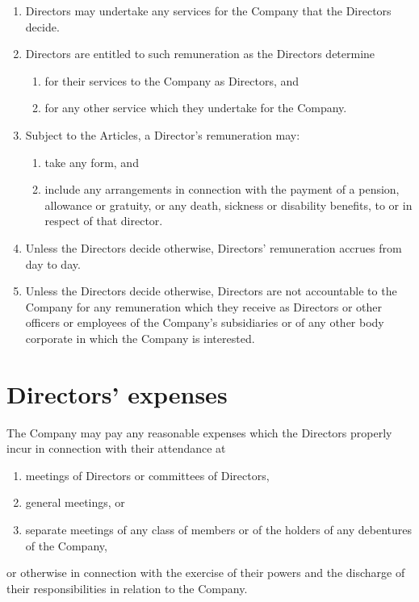 \documentclass[a4paper,12pt]{article}
\renewcommand{\labelenumi}{\thesection.\arabic{enumi}}
\renewcommand{\labelenumii}{\thesection.\arabic{enumi}.\arabic{enumii}}
\begin{document}
\begin{enumerate}
  \item Directors may undertake any services for the Company that the Directors decide.
  \item Directors are entitled to such remuneration as the Directors determine
  \begin{enumerate}
    \renewcommand{\labelenumii}{(\alph{enumii})}
    \item for their services to the Company as Directors, and
    \item for any other service which they undertake for the Company.
  \end{enumerate}
  \item	Subject to the Articles, a Director’s remuneration may:
  \begin{enumerate}
    \item take any form, and
    \item include any arrangements in connection with the payment of a pension, allowance or gratuity, or any death, sickness or disability benefits, to or in respect of that director.
  \end{enumerate}
  \item Unless the Directors decide otherwise, Directors’ remuneration accrues from day to day.
  \item	Unless the Directors decide otherwise, Directors are not accountable to the Company for any remuneration which they receive as Directors or other officers or employees of the Company’s subsidiaries or of any other body corporate in which the Company is interested.
\end{enumerate}

\section{Directors’ expenses}

The Company may pay any reasonable expenses which the Directors properly incur in connection with their attendance at

\begin{enumerate}
  \renewcommand{\labelenumi}{(\alph{enumi})}
  \item meetings of Directors or committees of Directors,
  \item general meetings, or
  \item separate meetings of any class of members or of the holders of any debentures of the Company,
\end{enumerate}
  or otherwise in connection with the exercise of their powers and the discharge of their responsibilities in relation to the Company.
\end{document}
